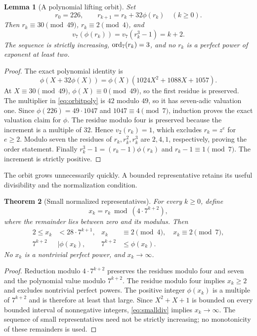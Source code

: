 \documentclass[11pt]{article}
\newtheorem{theorem}{Theorem}[section]
\newtheorem{lemma}[theorem]{Lemma}
\theoremstyle{definition}\newtheorem{definition}[theorem]{Definition}
\theoremstyle{remark}\newtheorem{remark}[theorem]{Remark}
\begin{document}
\begin{lemma}[A polynomial lifting orbit]\label{lem:orbit}
Set
\[
r_0=226,\qquad r_{k+1}=r_k+32\phi(r_k)\quad(k\ge0).
\]
Then $r_k\equiv30\pmod{49}$, $r_k\equiv2\pmod4$, and
\[
v_7(\phi(r_k))=v_7(r_k^3-1)=k+2.
\]
The sequence is strictly increasing, $\operatorname{ord}_7(r_k)=3$, and no $r_k$ is a
perfect power of exponent at least two.
\end{lemma}
\begin{proof}
The exact polynomial identity is
\begin{equation}\label{eq:orbitpoly}
\phi(X+32\phi(X))=\phi(X)(1024X^2+1088X+1057).
\end{equation}
At $X\equiv30\pmod{49}$, $\phi(X)\equiv0\pmod{49}$, so the first
residue is preserved. The multiplier in \eqref{eq:orbitpoly} is $42$ modulo
$49$, so it has seven-adic valuation one. Since
$\phi(226)=49\cdot1047$ and $1047\equiv4\pmod7$, induction proves the
exact valuation claim for $\phi$. The residue modulo four is preserved
because the increment is a multiple of $32$. Hence $v_2(r_k)=1$, which
excludes $r_k=z^e$ for $e\ge2$. Modulo seven the residues of $r_k,r_k^2,r_k^3$
are $2,4,1$, respectively, proving the order statement.
Finally $r_k^3-1=(r_k-1)\phi(r_k)$ and $r_k-1\equiv1\pmod7$.
The increment is strictly positive.
\end{proof}

The orbit grows unnecessarily quickly. A bounded representative retains
its useful divisibility and the normalization condition.
\begin{theorem}[Small normalized representatives]\label{thm:small}
For every $k\ge0$, define
\[
x_k=r_k\bmod(4\cdot7^{k+2}),
\]
where the remainder lies between zero and its modulus. Then
\begin{align}
2\le x_k&<28\cdot7^{k+1},&x_k&\equiv2\pmod4,\quad x_k\equiv2\pmod7,\label{eq:smallsize}\\
7^{k+2}&\mid\phi(x_k),& 7^{k+2}&\le\phi(x_k).\label{eq:smalldiv}
\end{align}
No $x_k$ is a nontrivial perfect power, and $x_k\to\infty$.
\end{theorem}
\begin{proof}
Reduction modulo $4\cdot7^{k+2}$ preserves the residues modulo four and
seven and the polynomial value modulo $7^{k+2}$. The residue modulo four
implies $x_k\ge2$ and excludes nontrivial perfect powers. The positive
integer $\phi(x_k)$ is a multiple of $7^{k+2}$ and is therefore at least
that large. Since $X^2+X+1$ is bounded on every bounded interval of
nonnegative integers, \eqref{eq:smalldiv} implies $x_k\to\infty$.
The sequence of small representatives need not be strictly increasing;
no monotonicity of these remainders is used.
\end{proof}
\end{document}
